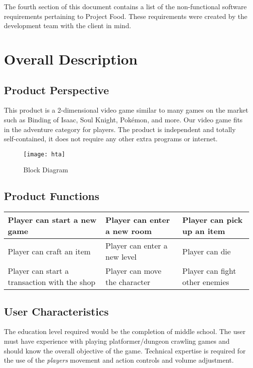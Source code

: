 \documentclass[12pt, titlepage]{article}
\begin{document}
  The fourth section of this document contains a list of the non-functional software requirements pertaining to Project Food. These requirements were created by the development team with the client in mind.

\section{Overall Description}

  \subsection{Product Perspective}
  This product is a 2-dimensional video game similar to many games on the market such as Binding of Isaac, Soul Knight, Pokémon, and more. Our video game fits in the adventure category for players. The product is independent and totally self-contained, it does not require any other extra programs or internet.
  
   \begin{figure}[htp]
	\centering
	\texttt{[image: hta]}
	\caption{Block Diagram}
	\label{fig:block}
   \end{figure}

  
  \subsection{Product Functions}
   \begin{center}
    \begin{tabular}{ | m{5em} | m{5em}| m{5em} | } 
    \hline
    Player can start a new game & Player can enter a new room & Player can pick up an item \\ 
    \hline
    Player can craft an item & Player can enter a new level & Player can die \\ 
    \hline
    Player can start a transaction with the shop & Player can move the character & Player can fight other enemies \\ 
    \hline
    \end{tabular}
    \end{center}
  \subsection{User Characteristics}
  The education level required would be the completion of middle school. The user must have experience with playing platformer/dungeon crawling games and should know the overall objective of the game. Technical expertise is required for the use of the \textit{players} movement and action controls and volume adjustment.
\end{document}
